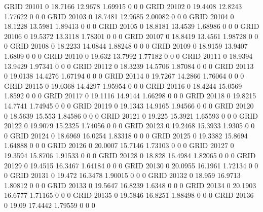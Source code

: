 GRID    20101   0       18.7166 12.9678 1.69915 0       0       0       
GRID    20102   0       19.4408 12.8243 1.77622 0       0       0       
GRID    20103   0       18.7481 12.9685 2.00082 0       0       0       
GRID    20104   0       18.1228 13.5981 1.89413 0       0       0       
GRID    20105   0       18.8181 13.4539 1.68986 0       0       0       
GRID    20106   0       19.5372 13.3118 1.78301 0       0       0       
GRID    20107   0       18.8419 13.4561 1.98728 0       0       0       
GRID    20108   0       18.2233 14.0844 1.88248 0       0       0       
GRID    20109   0       18.9159 13.9407 1.6809  0       0       0       
GRID    20110   0       19.632  13.7992 1.77182 0       0       0       
GRID    20111   0       18.9394 13.9429 1.97341 0       0       0       
GRID    20112   0       18.3239 14.5706 1.87084 0       0       0       
GRID    20113   0       19.0138 14.4276 1.67194 0       0       0       
GRID    20114   0       19.7267 14.2866 1.76064 0       0       0       
GRID    20115   0       19.0368 14.4297 1.95954 0       0       0       
GRID    20116   0       18.4244 15.0569 1.8592  0       0       0       
GRID    20117   0       19.1116 14.9144 1.66298 0       0       0       
GRID    20118   0       19.8215 14.7741 1.74945 0       0       0       
GRID    20119   0       19.1343 14.9165 1.94566 0       0       0       
GRID    20120   0       18.5639 15.553  1.84586 0       0       0       
GRID    20121   0       19.225  15.3921 1.65593 0       0       0       
GRID    20122   0       19.9079 15.2325 1.74056 0       0       0       
GRID    20123   0       19.2468 15.3933 1.9305  0       0       0       
GRID    20124   0       18.6969 16.0254 1.83318 0       0       0       
GRID    20125   0       19.3382 15.8694 1.64888 0       0       0       
GRID    20126   0       20.0007 15.7146 1.73103 0       0       0       
GRID    20127   0       19.3594 15.8706 1.91533 0       0       0       
GRID    20128   0       18.828  16.4984 1.82065 0       0       0       
GRID    20129   0       19.4515 16.3467 1.64184 0       0       0       
GRID    20130   0       20.0955 16.1961 1.72134 0       0       0       
GRID    20131   0       19.472  16.3478 1.90015 0       0       0       
GRID    20132   0       18.959  16.9713 1.80812 0       0       0       
GRID    20133   0       19.5647 16.8239 1.6348  0       0       0       
GRID    20134   0       20.1903 16.6777 1.71165 0       0       0       
GRID    20135   0       19.5846 16.8251 1.88498 0       0       0       
GRID    20136   0       19.09   17.4442 1.79559 0       0       0       

